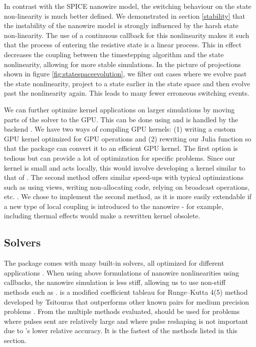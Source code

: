In contrast with the SPICE nanowire model, the switching behaviour on the state non-linearity is much better
defined. We demonstrated in section \ref{stability} that the instability of the nanowire model is strongly
influenced by the harsh state non-linearity. The use of a continuous callback for this nonlinearity makes it
such that the process of entering the resistive state is a linear process. This in effect decreases the coupling
between the timestepping algorithm and the state nonlinearity, allowing for more stable simulations. In the 
picture of projections shown in figure \ref{fig:statespaceevolution}, we filter out cases where we evolve
past the state nonlinearity, project to a state earlier in the state space and then evolve past the nonlinearity
again. This leads to many fewer erroneous switching events.

We can further optimize kernel applications on larger simulations by moving parts of the solver to the GPU. 
This can be done using  and is handled by the  backend \cite{CUDAjl, diffeqgpu}. 
We have two ways of compiling GPU kernels: (1) writing a custom GPU kernel optimized for GPU operations and 
(2) rewriting our Julia function so that the  package can convert it to an efficient GPU
kernel. The first option is tedious but can provide a lot of optimization for specific problems.
Since our kernel is small and acts locally, this would involve developing a kernel similar to that of 
 \cite{prefixsumcuda, juliacon_gpu}. The second method offers similar speed-ups with typical 
optimizations such as using views, writing non-allocating code, relying on broadcast operations, etc. 
\cite{juliacon_gpu}. We chose to implement the second method, as it is more easily extendable
if a new type of local coupling is introduced to the nanowire - for example, including thermal effects 
would make a rewritten kernel obsolete.

\subsection{Solvers} \label{solver}

The  package comes with many built-in solvers, all optimized for different
applications \cite{ODESolver-diffeq}. When using above formulations of nanowire nonlinearities using
callbacks, the nanowire simulation is less stiff, allowing us to use non-stiff methods such as .
 is a modified coefficient tableau for Runge–Kutta 4(5) method developed by Tsitouras
that outperforms other known pairs for medium precision problems \cite{tsit5}. From the multiple methods 
evaluated,  should be used for problems where pulses sent are relatively large and where pulse
reshaping is not important due to 's lower relative accuracy. It is the fastest of the methods
listed in this section.

